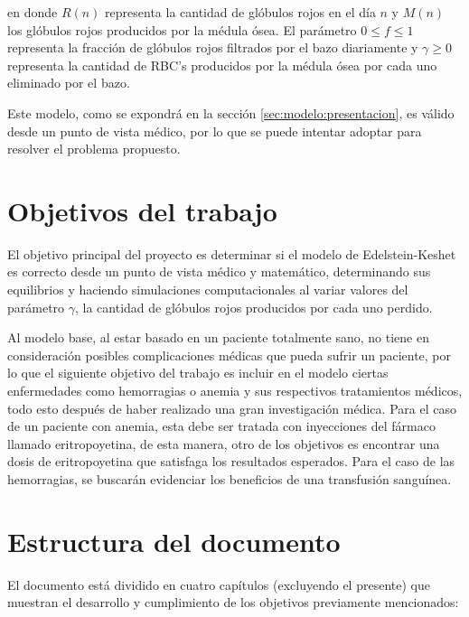en donde $R(n)$ representa la cantidad de glóbulos rojos en el día $n$ y $M(n)$ los glóbulos rojos producidos por la médula ósea. El parámetro $0\leq f \leq 1$ representa la fracción de glóbulos rojos filtrados por el bazo diariamente y $\gamma \geq 0$ representa la cantidad de RBC's producidos por la médula ósea por cada uno eliminado por el bazo. 

Este modelo, como se expondrá en la sección \ref{sec:modelo:presentacion}, es válido desde un punto de vista médico, por lo que se puede intentar adoptar para resolver el problema propuesto. 

\section{Objetivos del trabajo}

El objetivo principal del proyecto es determinar si el modelo de Edelstein-Keshet es correcto desde un punto de vista médico y matemático, determinando sus equilibrios y haciendo simulaciones computacionales al variar valores del parámetro $\gamma$, la cantidad de glóbulos rojos producidos por cada uno perdido.

Al modelo base, al estar basado en un paciente totalmente sano, no tiene en consideración posibles complicaciones médicas que pueda sufrir un paciente, por lo que el siguiente objetivo del trabajo es incluir en el modelo ciertas enfermedades como hemorragias o anemia y sus respectivos tratamientos médicos, todo esto después de haber realizado una gran investigación médica. Para el caso de un paciente con anemia, esta debe ser tratada con inyecciones del fármaco llamado eritropoyetina, de esta manera, otro de los objetivos es encontrar una dosis de eritropoyetina que satisfaga los resultados esperados. Para el caso de las hemorragias, se buscarán evidenciar los beneficios de una transfusión sanguínea.

\section{Estructura del documento}

El documento está dividido en cuatro capítulos (excluyendo el presente) que muestran el desarrollo y cumplimiento de los objetivos previamente mencionados:


